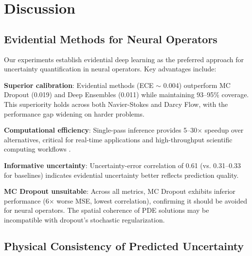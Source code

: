 \section{Discussion}

\subsection{Evidential Methods for Neural Operators}

Our experiments establish evidential deep learning as the preferred approach for uncertainty quantification in 
neural operators. Key advantages include:

\textbf{Superior calibration}: Evidential methods (ECE $\sim$ 0.004) outperform MC Dropout (0.019) and Deep 
Ensembles (0.011) while maintaining 93--95\% coverage. This superiority holds across both Navier-Stokes and 
Darcy Flow, with the performance gap widening on harder problems.

\textbf{Computational efficiency}: Single-pass inference provides 5--30$\times$ speedup over alternatives, 
critical for real-time applications and high-throughput scientific computing workflows
\cite{karniadakis2021physics,raissi2019physics}.

\textbf{Informative uncertainty}: Uncertainty-error correlation of 0.61 (vs. 0.31--0.33 for baselines) indicates 
evidential uncertainty better reflects prediction quality.

\textbf{MC Dropout unsuitable}: Across all metrics, MC Dropout exhibits inferior performance 
(6$\times$ worse MSE, lowest correlation), confirming it should be avoided for neural operators. 
The spatial coherence of PDE solutions may be incompatible with dropout's stochastic regularization.

\subsection{Physical Consistency of Predicted Uncertainty}

